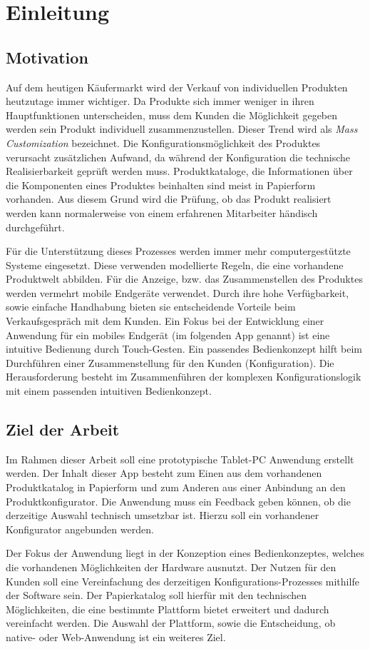 \chapter{Einleitung}
\section{Motivation} \label{aufgaben}
Auf dem heutigen Käufermarkt wird der Verkauf von individuellen Produkten heutzutage immer wichtiger. Da Produkte sich immer weniger in ihren Hauptfunktionen unterscheiden, muss dem Kunden die Möglichkeit gegeben werden sein Produkt individuell zusammenzustellen. Dieser Trend wird als \textit{Mass Customization} \cite{bib:massCustomization} bezeichnet. Die Konfigurationsmöglichkeit des Produktes verursacht zusätzlichen Aufwand, da während der Konfiguration die technische Realisierbarkeit geprüft werden muss. Produktkataloge, die Informationen über die Komponenten eines Produktes beinhalten sind meist in Papierform vorhanden. Aus diesem Grund wird die Prüfung, ob das Produkt realisiert werden kann normalerweise von einem erfahrenen Mitarbeiter händisch durchgeführt.

\par Für die Unterstützung dieses Prozesses werden immer mehr computergestützte Systeme eingesetzt. Diese verwenden modellierte Regeln, die eine vorhandene Produktwelt abbilden. Für die Anzeige, bzw. das Zusammenstellen des Produktes werden vermehrt mobile Endgeräte verwendet. Durch ihre hohe Verfügbarkeit, sowie einfache Handhabung bieten sie entscheidende Vorteile beim Verkaufsgespräch mit dem Kunden. Ein Fokus bei der Entwicklung einer Anwendung für ein mobiles Endgerät (im folgenden App genannt) ist eine intuitive Bedienung durch Touch-Gesten.  Ein passendes Bedienkonzept hilft beim Durchführen einer Zusammenstellung für den Kunden (Konfiguration). Die Herausforderung besteht im Zusammenführen der komplexen Konfigurationslogik mit einem passenden intuitiven Bedienkonzept. 


\section{Ziel der Arbeit} \label{goal}
Im Rahmen dieser Arbeit soll eine prototypische Tablet-PC Anwendung erstellt werden. Der Inhalt dieser App besteht zum Einen aus dem vorhandenen Produktkatalog in Papierform und zum Anderen aus einer Anbindung an den Produktkonfigurator.  Die Anwendung muss ein Feedback geben können, ob die derzeitige Auswahl technisch umsetzbar ist. Hierzu soll ein vorhandener Konfigurator angebunden werden.
\par
Der Fokus der Anwendung liegt in der Konzeption eines Bedienkonzeptes, welches die vorhandenen Möglichkeiten der Hardware ausnutzt. Der Nutzen für den Kunden soll eine Vereinfachung des derzeitigen Konfigurations-Prozesses mithilfe der Software sein. Der Papierkatalog soll hierfür mit den technischen Möglichkeiten, die eine bestimmte Plattform bietet erweitert und dadurch vereinfacht werden. Die Auswahl der Plattform, sowie die Entscheidung, ob native- oder Web-Anwendung ist ein weiteres Ziel. 




